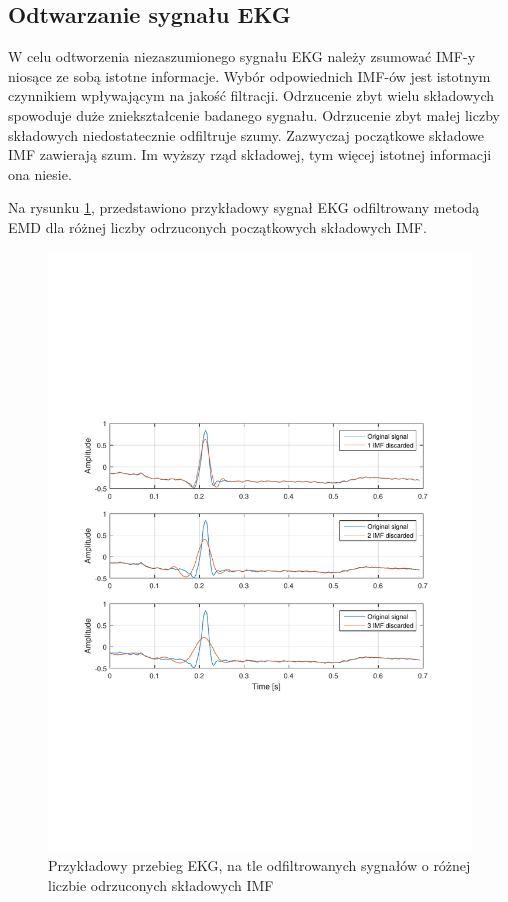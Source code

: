 \newpage

\subsection{Odtwarzanie sygnału EKG}
\indent

W celu odtworzenia niezaszumionego sygnału EKG należy zsumować IMF-y niosące ze
sobą istotne informacje. Wybór odpowiednich IMF-ów jest istotnym czynnikiem
wpływającym na jakość filtracji. Odrzucenie zbyt wielu składowych spowoduje duże
zniekształcenie badanego sygnału. Odrzucenie zbyt małej liczby składowych
niedostatecznie odfiltruje szumy. Zazwyczaj początkowe składowe IMF zawierają
szum. Im wyższy rząd składowej, tym więcej istotnej informacji ona niesie.

Na rysunku \ref{rys:example_ekg}, przedstawiono przykładowy sygnał EKG
odfiltrowany metodą EMD dla różnej liczby odrzuconych początkowych składowych
IMF.

\begin{figure}[!htb]
    \begin{center}
        \includegraphics[width=14cm,trim=3cm 8cm 3cm 8cm,clip]
        {../img/ka_example.pdf}
    \end{center}
    \caption{Przykładowy przebieg EKG, na tle odfiltrowanych sygnałów o różnej
    liczbie odrzuconych składowych IMF}
    \label{rys:example_ekg}
\end{figure}


